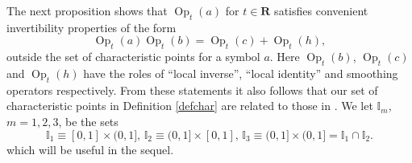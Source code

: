 \documentclass[12pt,a4paper,reqno]{amsart}
\numberwithin{equation}{section}
\numberwithin{thm}{section}
\theoremstyle{definition}
\theoremstyle{remark}
\begin{document}
\par

The next proposition shows that ${\operatorname{Op}} _t(a)$ for
$t\in \mathbf R$ satisfies
convenient invertibility properties of the form
\begin{equation}\label{locinvop}
{\operatorname{Op}} _t(a){\operatorname{Op}} _t(b) = {\operatorname{Op}} _t(c) + {\operatorname{Op}} _t(h),
\end{equation}
outside the set of characteristic
points for a symbol $a$. Here ${\operatorname{Op}} _t(b)$, ${\operatorname{Op}} _t(c)$ and ${\operatorname{Op}} _t(h)$ have
the roles of ``local inverse'', ``local identity'' and smoothing operators
respectively. From these statements it also follows that our set of
characteristic points in Definition \ref{defchar} are related to those
in \cite{CoMa,Ho1}. 
We let $\mathbb I_m$,
$m=1,2,3$, be the sets
\begin{equation}\label{isets}
\mathbb I_1  \equiv [0,1]\times (0,1],\,
\mathbb I_2 \equiv (0,1]\times [0,1],\,
\mathbb I_3 \equiv  (0,1]\times (0,1] =
\mathbb I_1\cap \mathbb I_2.
\end{equation}
which will be useful in the sequel.

\par
\end{document}

